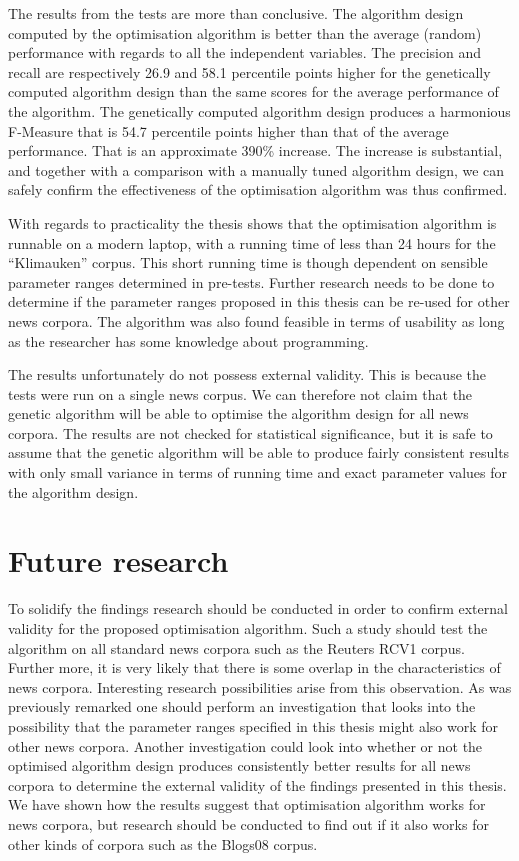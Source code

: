 The results from the tests are more than conclusive. The algorithm design computed by the optimisation algorithm is better than the average (random) performance with regards to all the independent variables. The precision and recall are respectively 26.9 and 58.1 percentile points higher for the genetically computed algorithm design than the same scores for the average performance of the algorithm. The genetically computed algorithm design produces a harmonious F-Measure that is 54.7 percentile points higher than that of the average performance. That is an approximate 390\% increase. The increase is substantial, and together with a comparison with a manually tuned algorithm design, we can safely confirm the effectiveness of the optimisation algorithm was thus confirmed.

With regards to practicality the thesis shows that the optimisation algorithm is runnable on a modern laptop, with a running time of less than 24 hours for the ``Klimauken'' corpus. This short running time is though dependent on sensible parameter ranges determined in pre-tests. Further research needs to be done to determine if the parameter ranges proposed in this thesis can be re-used for other news corpora. The algorithm was also found feasible in terms of usability as long as the researcher has some knowledge about programming.

The results unfortunately do not possess external validity. This is because the tests were run on a single news corpus. We can therefore not claim that the genetic algorithm will be able to optimise the algorithm design for all news corpora. The results are not checked for statistical significance, but it is safe to assume that the genetic algorithm will be able to produce fairly consistent results with only small variance in terms of running time and exact parameter values for the algorithm design.

\section{Future research}
To solidify the findings research should be conducted in order to confirm external validity for the proposed optimisation algorithm. Such a study should test the algorithm on all standard news corpora such as the Reuters RCV1 corpus. Further more, it is very likely that there is some overlap in the characteristics of news corpora. Interesting research possibilities arise from this observation. As was previously remarked one should perform an investigation that looks into the possibility that the parameter ranges specified in this thesis might also work for other news corpora. Another investigation could look into whether or not the optimised algorithm design produces consistently better results for all news corpora to determine the external validity of the findings presented in this thesis. We have shown how the results suggest that optimisation algorithm works for news corpora, but research should be conducted to find out if it also works for other kinds of corpora such as the Blogs08 corpus.


